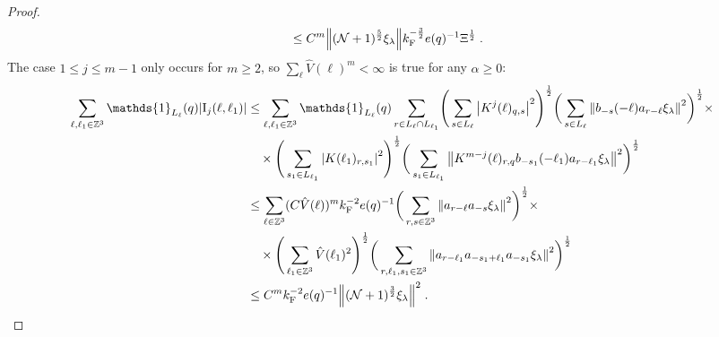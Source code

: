 \documentclass[12pt,a4paper]{article}
\numberwithin{equation}{section}
\newcommand{\1}{\mathbb{I}}
\newcommand{\F}{\mathrm{F}}
\newcommand{\I}{\mathrm{I}}
\newcommand{\Zstar}{\mathbb{Z}^3} %
\newcommand{\Z}{\mathbb{Z}}
\newcommand{\NN}{\mathcal{N}}
\newcommand{\half}{\frac{1}{2}}
\theoremstyle{plain}
\theoremstyle{definition}
\theoremstyle{remark}
\theoremstyle{plain}
\theoremstyle{definition}
\theoremstyle{remark}
\begin{document}
\begin{proof}
\begin{align}
 	&\leq C^m \norm{ (\NN+1)^{\frac 52}\xi_\lambda}
 		k_{\F}^{-\frac 32} e(q)^{-1} \Xi^{\half} \;. \label{eq:estEQ2111} 
\end{align}
The case $ 1 \le j \le m-1 $ only occurs for $ m \ge 2 $, so $ \sum_\ell \hat{V}(\ell)^m < \infty $ is true for any $ \alpha \ge 0 $:
\begin{align}
	\sum_{\ell,\ell_1 \in \Zstar} \mathds{1}_{L_\ell}(q) |\I_j(\ell, \ell_1)|
	&\leq \sum_{\ell,\ell_1 \in \Zstar} \mathds{1}_{L_\ell}(q) \sum\limits_{r\in L_{\ell} \cap L_{\ell_1}}\! \Bigg( \sum\limits_{s \in L_\ell} \abs{K^{j}(\ell)_{q,s}}^2\Bigg)^\half \bigg( \sum\limits_{s \in L_\ell}\norm{b_{-s}(-\ell) a_{r-\ell} \xi_\lambda}^2\bigg)^\half \times\nonumber\\
		&\quad \times \Bigg( \sum\limits_{s_1 \in L_{\ell_1}}\abs{K(\ell_1)_{r,s_1}}^2\Bigg)^\half \bigg(\sum\limits_{s_1 \in L_{\ell_1}}\norm{ K^{m-j}(\ell)_{r,q} b_{-s_1}(-\ell_1)  a_{r-\ell_1} \xi_\lambda }^2\bigg)^\half
	\nonumber\\
	&\leq \sum_{\ell \in \Zstar} (C \hat{V}(\ell))^m
		k_{\F}^{-2} e(q)^{-1}
		\bigg( \sum\limits_{r, s\in \Z^3} \norm{ a_{r-\ell} a_{-s} \xi_\lambda}^2\bigg)^\half \times \nonumber\\
		&\quad \times 
		\Bigg( \sum_{\ell_1 \in \Zstar} \hat{V}(\ell_1)^2 \Bigg)^{\half}
	\bigg(
		\sum\limits_{r, \ell_1, s_1 \in \Z^3} \norm{ a_{r-\ell_1} a_{-s_1 + \ell_1} a_{-s_1} \xi_\lambda }^2\bigg)^\half
	\nonumber\\
	&\leq C^m k_{\F}^{-2} e(q)^{-1}
	\norm{ (\NN+1)^{\frac 32} \xi_\lambda}^2 \;. \label{eq:estEQ2112_Coulomb}
\end{align}

\end{proof}
\end{document}
